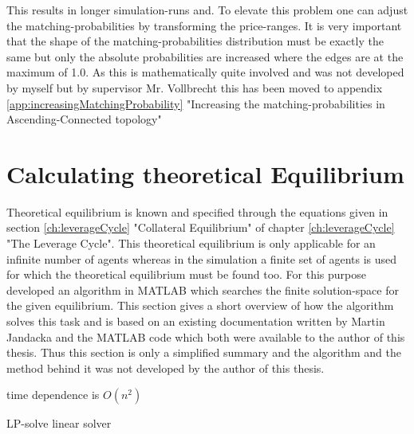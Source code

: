 \documentclass[Bachelorarbeit.tex]{subfiles}
\begin{document}
This results in longer simulation-runs and. To elevate this problem one can adjust the matching-probabilities by transforming the price-ranges. It is very important that the shape of the matching-probabilities distribution must be exactly the same but only the absolute probabilities are increased where the edges are at the maximum of 1.0. As this is mathematically quite involved and was not developed by myself but by supervisor Mr. Vollbrecht this has been moved to appendix \ref{app:increasingMatchingProbability} "Increasing the matching-probabilities in Ascending-Connected topology"

\section{Calculating theoretical Equilibrium}
Theoretical equilibrium is known and specified through the equations given in section \ref{ch:leverageCycle} "Collateral Equilibrium" of chapter \ref{ch:leverageCycle} "The Leverage Cycle". This theoretical equilibrium is only applicable for an infinite number of agents whereas in the simulation a finite set of agents is used for which the theoretical equilibrium must be found too. For this purpose \cite{Breuer2015} developed an algorithm in MATLAB which searches the finite solution-space for the given equilibrium. This section gives a short overview of how the algorithm solves this task and is based on an existing documentation written by Martin Jandacka and the MATLAB code which both were available to the author of this thesis. Thus this section is only a simplified summary and the algorithm and the method behind it was not developed by the author of this thesis.

time dependence is $O(n^2)$

\medskip

LP-solve linear solver
\end{document}
